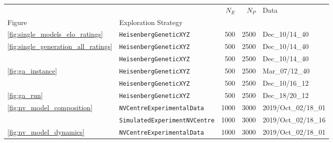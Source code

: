 \begin{tabular}{llrrl}
\hline
                        &                                                      &                                    $N_E$ &                                    $N_P$ &                                     Data \\
Figure & Exploration Strategy &                                          &                                          &                                          \\
\midrule
\cref{fig:single_models_elo_ratings} & \texttt{HeisenbergGeneticXYZ} &                                      500 &                                     2500 &                           Dec\_10/14\_40 \\
\multirow{2}{*}{\cref{fig:single_generation_all_ratings}} & \texttt{HeisenbergGeneticXYZ} &                                      500 &                                     2500 &                           Dec\_10/14\_40 \\
                        & \texttt{HeisenbergGeneticXYZ} &                                      500 &                                     2500 &                           Dec\_10/14\_40 \\
\cline{1-5}
\multirow{2}{*}{\cref{fig:ga_instance}} & \texttt{HeisenbergGeneticXYZ} &                                      500 &                                     2500 &                           Mar\_07/12\_40 \\
                        & \texttt{HeisenbergGeneticXYZ} &                                      500 &                                     2500 &                           Dec\_10/16\_12 \\
\cline{1-5}
\cref{fig:ga_run} & \texttt{HeisenbergGeneticXYZ} &                                      500 &                                     2500 &                           Dec\_18/20\_12 \\
\multirow{2}{*}{\cref{fig:nv_model_composition}} & \texttt{NVCentreExperimentalData} &                                     1000 &                                     3000 &                      2019/Oct\_02/18\_01 \\
                        & \texttt{SimulatedExperimentNVCentre} &                                     1000 &                                     3000 &                      2019/Oct\_02/18\_16 \\
\cline{1-5}
\cref{fig:nv_model_dynamics} & \texttt{NVCentreExperimentalData} &                                     1000 &                                     3000 &                      2019/Oct\_02/18\_01 \\

\end{tabular}
